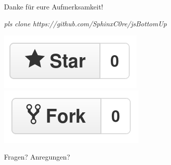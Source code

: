 \documentclass{beamer}
\begin{document}
\begin{frame}
\Huge{\centerline{Danke für eure Aufmerksamkeit!}}

\begin{normalsize}

\centerline{\textit{pls clone https://github.com/SphinxC0re/jsBottomUp}}
\centerline{\includegraphics[scale=0.2]{assets/like_button.png} \includegraphics[scale=0.2]{assets/dislike_button.png}}
\end{normalsize}
\end{frame}

\begin{frame}
\Huge{\centerline{Fragen? Anregungen?}}
\end{frame}

\end{document}
